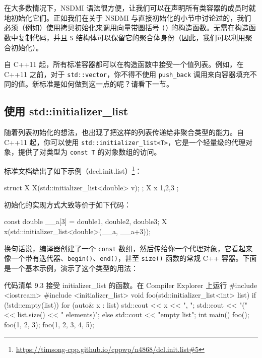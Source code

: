 在大多数情况下，NSDMI 语法很方便，让我们可以在声明所有类容器的成员时就地初始化它们。正如我们在关于 NSDMI 与直接初始化的小节中讨论过的，我们必须（例如）使用拷贝初始化来调用向量带圆括号 \texttt{()} 的构造函数。无需在构造函数中复制代码，并且 \texttt{S} 结构体可以保留它的聚合体身份（因此，我们可以利用聚合初始化）。

自 C++11 起，所有标准容器都可以在构造函数中接受一个值列表。例如，在 C++11 之前，对于 \texttt{std::vector}，你不得不使用 \texttt{push\_back} 调用来向容器填充不同的值。新标准是如何做到这一点的呢？请看下一节。

\subsection{使用 std::initializer\_list}

随着列表初始化的想法，也出现了把这样的列表传递给非聚合类型的能力。自 C++11 起，你可以使用 \texttt{std::initializer\_list<T>}，它是一个轻量级的代理对象，提供了对类型为 \texttt{const T} 的对象数组的访问。

标准文档给出了如下示例（decl.init.list）\footnote{\url{https://timsong-cpp.github.io/cppwp/n4868/dcl.init.list\#5}}：

\begin{codebox}[cpp]
struct X {
    X(std::initializer_list<double> v);
};
X x{ 1,2,3 };
\end{codebox}

初始化的实现方式大致等价于如下代码：

\begin{codebox}[cpp]
const double __a[3] = {double{1}, double{2}, double{3}};
X x(std::initializer_list<double>(__a, __a+3));
\end{codebox}

换句话说，编译器创建了一个 \texttt{const} 数组，然后传给你一个代理对象，它看起来像一个带有迭代器、\texttt{begin()}、\texttt{end()}，甚至 \texttt{size()} 函数的常规 C++ 容器。下面是一个基本示例，演示了这个类型的用法：

\begin{codeboxt}[cpp]{代码清单 9.3 接受 initializer\_list 的函数。在 Compiler Explorer 上运行}
#include <iostream>
#include <initializer_list>
void foo(std::initializer_list<int> list) {
    if (!std::empty(list)) {
        for (auto& x : list)
            std::cout << x << ", ";
        std::cout << "(" << list.size() << " elements)\n";
    }
    else
        std::cout << "empty list\n";
}
int main() {
    foo({});
    foo({1, 2, 3});
    foo({1, 2, 3, 4, 5});
}
\end{codeboxt}

